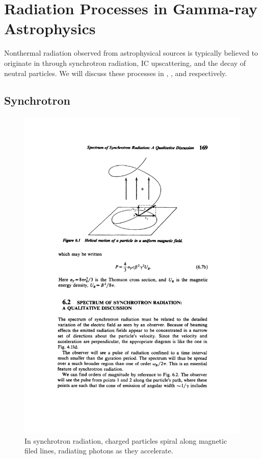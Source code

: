 \section{Radiation Processes in Gamma-ray Astrophysics}

Nonthermal radiation observed from astrophysical sources is
typically believed to originate in through synchrotron radiation, \ac{IC}
upscattering, and the
decay of neutral \pion particles.  We will discuss these processes
in , , and
 respectively.

\subsection{Synchrotron}

\begin{figure}[htbp]
  \centering 
    \includegraphics{chapters/introduction/figures/syncrotron_radiation_spiral.pdf}
    \caption{In synchrotron radiation, charged particles spiral along
      magnetic filed lines, radiating photons as they accelerate.}
\end{figure}


